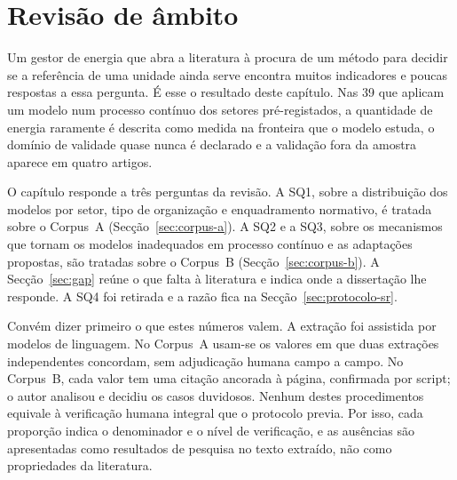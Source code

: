 
\chapter{Revisão de âmbito}
\label{cha:revisao}

Um gestor de energia que abra a literatura à procura de um método para
decidir se a referência de uma unidade ainda serve encontra muitos
indicadores e poucas respostas a essa pergunta. É esse o resultado deste
capítulo.  Nas 39 que aplicam
um modelo num processo contínuo dos setores pré-registados, a quantidade
de energia raramente é descrita como medida na fronteira que o modelo
estuda, o domínio de validade quase nunca é declarado e a validação fora
da amostra aparece em quatro artigos. 

O capítulo responde a três perguntas da revisão. A SQ1, sobre a
distribuição dos modelos por setor, tipo de organização e enquadramento
normativo, é tratada sobre o Corpus~A (Secção~\ref{sec:corpus-a}).
A SQ2 e a SQ3, sobre os mecanismos que tornam os modelos inadequados
em processo contínuo e as adaptações propostas, são tratadas sobre o
Corpus~B (Secção~\ref{sec:corpus-b}). A Secção~\ref{sec:gap} reúne o que
falta à literatura e indica onde a dissertação lhe responde. A SQ4 foi
retirada e a razão fica na Secção~\ref{sec:protocolo-sr}.

Convém dizer primeiro o que estes números valem. A extração foi
assistida por modelos de linguagem. No Corpus~A usam-se os valores em
que duas extrações independentes concordam, sem adjudicação humana campo
a campo. No Corpus~B, cada valor tem uma citação ancorada à página,
confirmada por script; o autor analisou e decidiu os casos duvidosos. Nenhum destes procedimentos equivale à
verificação humana integral que o protocolo previa. Por isso, cada
proporção indica o denominador e o nível de verificação, e as
ausências são apresentadas como resultados de pesquisa no texto extraído,
não como propriedades da literatura.


